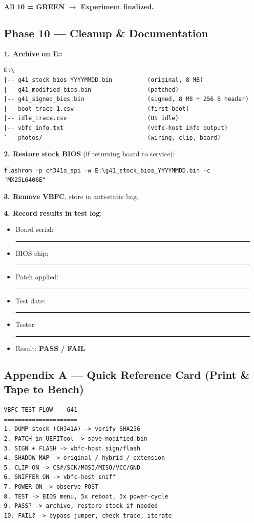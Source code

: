 \textbf{All 10 = GREEN $\to$ Experiment finalized.}

\subsection*{Phase 10 — Cleanup \& Documentation}

\textbf{1. Archive on E::}
\begin{lstlisting}[style=vbfcStyle]
E:\
|-- g41_stock_bios_YYYYMMDD.bin          (original, 8 MB)
|-- g41_modified_bios.bin                (patched)
|-- g41_signed_bios.bin                  (signed, 8 MB + 256 B header)
|-- boot_trace_1.csv                     (first boot)
|-- idle_trace.csv                       (OS idle)
|-- vbfc_info.txt                        (vbfc-host info output)
`-- photos/                              (wiring, clip, board)
\end{lstlisting}

\textbf{2. Restore stock BIOS} (if returning board to service):
\begin{lstlisting}[style=vbfcStyle]
flashrom -p ch341a_spi -w E:\g41_stock_bios_YYYYMMDD.bin -c "MX25L6406E"
\end{lstlisting}

\textbf{3. Remove VBFC}, store in anti-static bag.

\textbf{4. Record results in test log:}
\begin{itemize}
    \item Board serial: \rule{5cm}{0.4pt}
    \item BIOS chip: \rule{5cm}{0.4pt}
    \item Patch applied: \rule{5cm}{0.4pt}
    \item Test date: \rule{5cm}{0.4pt}
    \item Tester: \rule{5cm}{0.4pt}
    \item Result: \textbf{PASS / FAIL}
\end{itemize}

\subsection*{Appendix A — Quick Reference Card (Print \& Tape to Bench)}

\begin{lstlisting}[style=vbfcStyle]
VBFC TEST FLOW -- G41
=====================
1. DUMP stock (CH341A) -> verify SHA256
2. PATCH in UEFITool -> save modified.bin
3. SIGN + FLASH -> vbfc-host sign/flash
4. SHADOW MAP -> original / hybrid / extension
5. CLIP ON -> CS#/SCK/MOSI/MISO/VCC/GND
6. SNIFFER ON -> vbfc-host sniff
7. POWER ON -> observe POST
8. TEST -> BIOS menu, 5x reboot, 3x power-cycle
9. PASS? -> archive, restore stock if needed
10. FAIL? -> bypass jumper, check trace, iterate
\end{lstlisting}

